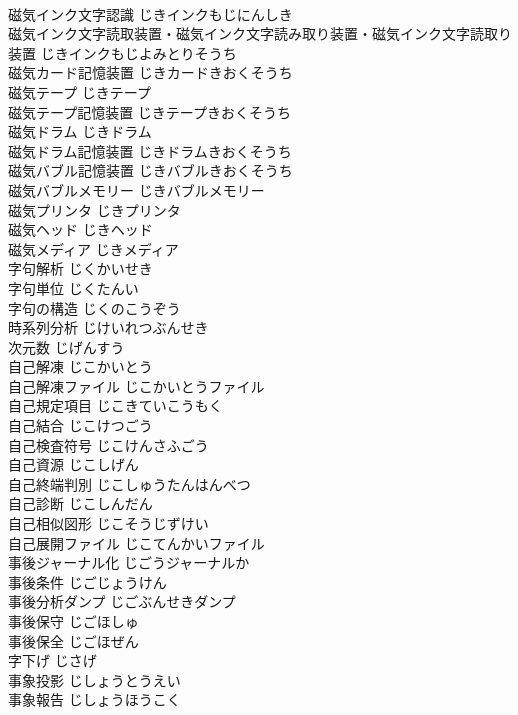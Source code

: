 \documentclass[8pt]{extreport}
\begin{document}
\begin{CJK}{UTF8}{min}
\\	磁気インク文字認識	じきインクもじにんしき	
\\	磁気インク文字読取装置・磁気インク文字読み取り装置・磁気インク文字読取り装置	じきインクもじよみとりそうち	
\\	磁気カード記憶装置	じきカードきおくそうち	
\\	磁気テープ	じきテープ	
\\	磁気テープ記憶装置	じきテープきおくそうち	
\\	磁気ドラム	じきドラム	
\\	磁気ドラム記憶装置	じきドラムきおくそうち	
\\	磁気バブル記憶装置	じきバブルきおくそうち	
\\	磁気バブルメモリー	じきバブルメモリー	
\\	磁気プリンタ	じきプリンタ	
\\	磁気ヘッド	じきヘッド	
\\	磁気メディア	じきメディア	
\\	字句解析	じくかいせき	
\\	字句単位	じくたんい	
\\	字句の構造	じくのこうぞう	
\\	時系列分析	じけいれつぶんせき	
\\	次元数	じげんすう	
\\	自己解凍	じこかいとう	
\\	自己解凍ファイル	じこかいとうファイル	
\\	自己規定項目	じこきていこうもく	
\\	自己結合	じこけつごう	
\\	自己検査符号	じこけんさふごう	
\\	自己資源	じこしげん	
\\	自己終端判別	じこしゅうたんはんべつ	
\\	自己診断	じこしんだん	
\\	自己相似図形	じこそうじずけい	
\\	自己展開ファイル	じこてんかいファイル	
\\	事後ジャーナル化	じごうジャーナルか	
\\	事後条件	じごじょうけん	
\\	事後分析ダンプ	じごぶんせきダンプ	
\\	事後保守	じごほしゅ	
\\	事後保全	じごほぜん	
\\	字下げ	じさげ	
\\	事象投影	じしょうとうえい	
\\	事象報告	じしょうほうこく	

\end{CJK}
\end{document}
